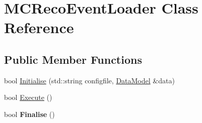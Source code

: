\hypertarget{classMCRecoEventLoader}{
\section{MCRecoEventLoader Class Reference}
\label{classMCRecoEventLoader}
}
\subsection*{Public Member Functions}
\begin{DoxyCompactItemize}
\item 
bool \hyperlink{classMCRecoEventLoader_a3c57d089982246d613d553092ab8f141}{Initialise} (std::string configfile, \hyperlink{classDataModel}{DataModel} \&data)
\item 
bool \hyperlink{classMCRecoEventLoader_a17027f8a3689b459fa54a4a3c84b5a0c}{Execute} ()
\item 
\hypertarget{classMCRecoEventLoader_ac4b21a91ed4795b7ffc9695ec38438e2}{
bool {\bfseries Finalise} ()}
\label{classMCRecoEventLoader_ac4b21a91ed4795b7ffc9695ec38438e2}


\end{DoxyCompactItemize}
